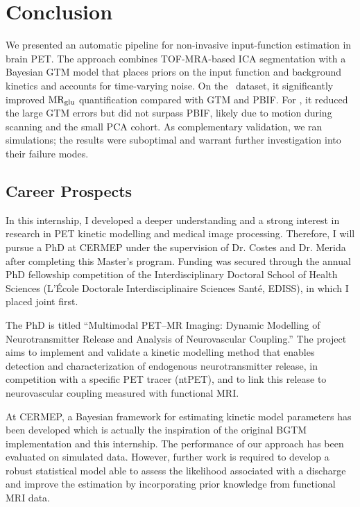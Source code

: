 \chapter{Conclusion}
We presented an automatic pipeline for non-invasive input-function estimation in brain PET.
The approach combines TOF-MRA-based ICA segmentation with a Bayesian GTM model that places priors on the input function and background kinetics and accounts for time-varying noise.
On the \fdg\ dataset, it significantly improved \(\text{MR}_{\text{glu}}\) quantification compared with GTM and PBIF.
For \yohimbine, it reduced the large GTM errors but did not surpass PBIF, likely due to motion during scanning and the small PCA cohort.
As complementary validation, we ran simulations; the results were suboptimal and warrant further investigation into their failure modes.

\section*{Career Prospects}
In this internship, I developed a deeper understanding and a strong interest in research in PET kinetic modelling and medical image processing.
Therefore, I will pursue a PhD at CERMEP under the supervision of Dr. Costes and Dr. Merida after completing this Master's program.
Funding was secured through the annual PhD fellowship competition of the Interdisciplinary Doctoral School of Health Sciences (L'École Doctorale Interdisciplinaire Sciences Santé, EDISS), in which I placed joint first.

The PhD is titled “Multimodal PET–MR Imaging: Dynamic Modelling of Neurotransmitter Release and Analysis of Neurovascular Coupling.”
The project aims to implement and validate a kinetic modelling method that enables detection and characterization of endogenous neurotransmitter release, in competition with a specific PET tracer (ntPET), and to link this release to neurovascular coupling measured with functional MRI.

At CERMEP, a Bayesian framework for estimating kinetic model parameters has been developed \cite{irace2020bayesian} which is actually the inspiration of the original BGTM implementation and this internship.
The performance of our approach has been evaluated on simulated data.
However, further work is required to develop a robust statistical model able to assess the likelihood associated with a discharge and improve the estimation by incorporating prior knowledge from functional MRI data.
